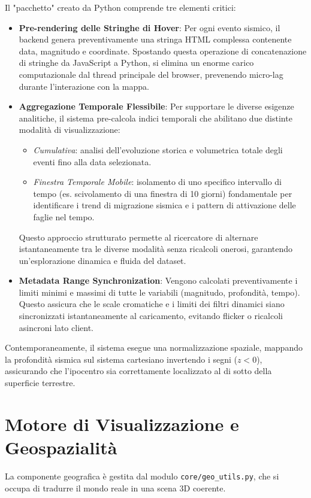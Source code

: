 \documentclass[12pt,a4paper]{article}
\begin{document}
Il "pacchetto" creato da Python comprende tre elementi critici:
\begin{itemize}
    \item \textbf{Pre-rendering delle Stringhe di Hover}: Per ogni evento sismico, il backend genera preventivamente una stringa HTML complessa contenente data, magnitudo e coordinate. Spostando questa operazione di concatenazione di stringhe da JavaScript a Python, si elimina un enorme carico computazionale dal thread principale del browser, prevenendo micro-lag durante l'interazione con la mappa.
    \item \textbf{Aggregazione Temporale Flessibile}: Per supportare le diverse esigenze analitiche, il sistema pre-calcola indici temporali che abilitano due distinte modalità di visualizzazione:
        \begin{itemize}
            \item \textit{Cumulativa}: analisi dell'evoluzione storica e volumetrica totale degli eventi fino alla data selezionata.
            \item \textit{Finestra Temporale Mobile}: isolamento di uno specifico intervallo di tempo (es. scivolamento di una finestra di 10 giorni) fondamentale per identificare i trend di migrazione sismica e i pattern di attivazione delle faglie nel tempo.
        \end{itemize}
    Questo approccio strutturato permette al ricercatore di alternare istantaneamente tra le diverse modalità senza ricalcoli onerosi, garantendo un'esplorazione dinamica e fluida del dataset.
    \item \textbf{Metadata Range Synchronization}: Vengono calcolati preventivamente i limiti minimi e massimi di tutte le variabili (magnitudo, profondità, tempo). Questo assicura che le scale cromatiche e i limiti dei filtri dinamici siano sincronizzati istantaneamente al caricamento, evitando flicker o ricalcoli asincroni lato client.
\end{itemize}
Contemporaneamente, il sistema esegue una normalizzazione spaziale, mappando la profondità sismica sul sistema cartesiano invertendo i segni ($z < 0$), assicurando che l'ipocentro sia correttamente localizzato al di sotto della superficie terrestre.

\section{Motore di Visualizzazione e Geospazialità}
La componente geografica è gestita dal modulo \texttt{core/geo\_utils.py}, che si occupa di tradurre il mondo reale in una scena 3D coerente.
\end{document}

